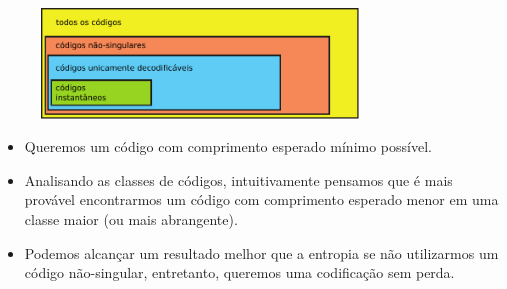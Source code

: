 \begin{frame}[allowframebreaks]
  \framebreak

  \begin{figure}[h!]
  \centering
  \includegraphics[width=0.75\textwidth]{images/tiposcodigos.pdf}
  \label{fig:tiposcodigos}
  \end{figure}

  \begin{itemize}
  \item Queremos um código com comprimento esperado mínimo possível.
  \item Analisando as classes de códigos, intuitivamente pensamos que é mais provável encontrarmos
	um código com comprimento esperado menor em uma classe maior (ou mais abrangente).
  \item Podemos alcançar um resultado melhor que a entropia se não utilizarmos um código não-singular,
	entretanto, queremos uma codificação sem perda.
  \end{itemize} 
\end{frame}



